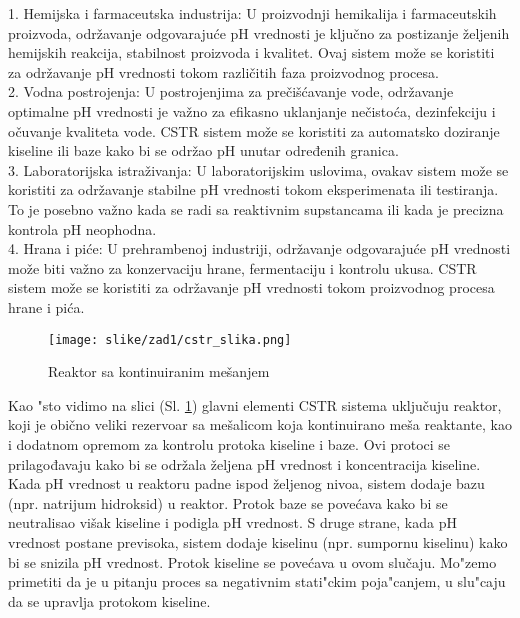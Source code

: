 \documentclass[a4paper,11pt]{article}
\theoremstyle{definition} \newtheorem{deff}{Definicija}[section]
\theoremstyle{definition} \newtheorem{prim}[deff]{Primer}
\theoremstyle{plain} \newtheorem{teor}[deff]{Teorema}
\begin{document}
	1. Hemijska i farmaceutska industrija: U proizvodnji hemikalija i farmaceutskih proizvoda, održavanje odgovarajuće pH vrednosti je ključno za postizanje željenih hemijskih reakcija, stabilnost proizvoda i kvalitet. Ovaj sistem može se koristiti za održavanje pH vrednosti tokom različitih faza proizvodnog procesa. \\
	
	2. Vodna postrojenja: U postrojenjima za prečišćavanje vode, održavanje optimalne pH vrednosti je važno za efikasno uklanjanje nečistoća, dezinfekciju i očuvanje kvaliteta vode. CSTR sistem može se koristiti za automatsko doziranje kiseline ili baze kako bi se održao pH unutar određenih granica. \\
	
	3. Laboratorijska istraživanja: U laboratorijskim uslovima, ovakav sistem može se koristiti za održavanje stabilne pH vrednosti tokom eksperimenata ili testiranja. To je posebno važno kada se radi sa reaktivnim supstancama ili kada je precizna kontrola pH neophodna. \\
	
	4. Hrana i piće: U prehrambenoj industriji, održavanje odgovarajuće pH vrednosti može biti važno za konzervaciju hrane, fermentaciju i kontrolu ukusa. CSTR sistem može se koristiti za održavanje pH vrednosti tokom proizvodnog procesa hrane i pića. \\
	
	\begin{figure}[!h]
		\centering
		\texttt{[image: slike/zad1/cstr\_slika.png]}
		\caption{Reaktor sa kontinuiranim mešanjem}
		\label{fig:cstr}
	\end{figure}
	
	Kao "sto vidimo na slici (Sl. \ref{fig:cstr}) glavni elementi CSTR sistema uključuju reaktor, koji je obično veliki rezervoar sa mešalicom koja kontinuirano meša reaktante, kao i dodatnom opremom za kontrolu protoka kiseline i baze. Ovi protoci se prilagođavaju kako bi se održala željena pH vrednost i koncentracija kiseline. \\
	
	Kada pH vrednost u reaktoru padne ispod željenog nivoa, sistem dodaje bazu (npr. natrijum hidroksid) u reaktor. Protok baze se povećava kako bi se neutralisao višak kiseline i podigla pH vrednost. S druge strane, kada pH vrednost postane previsoka, sistem dodaje kiselinu (npr. sumpornu kiselinu) kako bi se snizila pH vrednost. Protok kiseline se povećava u ovom slučaju. Mo"zemo primetiti da je u pitanju proces sa negativnim stati"ckim poja"canjem, u slu"caju da se upravlja protokom kiseline.
	
\end{document}
